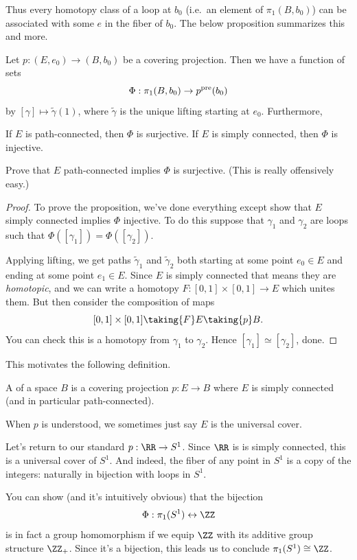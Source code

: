 Thus every homotopy class of a loop at $b_0$ (i.e.\ an element of $\pi_1(B, b_0)$) can be associated with some $e$ in the fiber of $b_0$.
The below proposition summarizes this and more.
\begin{proposition}
	Let $p : (E,e_0) \to (B,b_0)$ be a covering projection.
	Then we have a function of sets
	\[ \Phi : \pi_1(B, b_0) \to p^{\text{pre}}(b_0) \]
	by $[\gamma] \mapsto \tilde\gamma(1)$, where $\tilde\gamma$
	is the unique lifting starting at $e_0$.
	Furthermore,
	\begin{itemize}
		\ii If $E$ is path-connected, then $\Phi$ is surjective.
		\ii If $E$ is simply connected, then $\Phi$ is injective.
	\end{itemize}
\end{proposition}
\begin{ques}
	Prove that $E$ path-connected implies $\Phi$ is surjective.
	(This is really offensively easy.)
\end{ques}
\begin{proof}
	To prove the proposition, we've done everything except show
	that $E$ simply connected implies $\Phi$ injective.
	To do this suppose that $\gamma_1$ and $\gamma_2$ are loops
	such that $\Phi([\gamma_1]) = \Phi([\gamma_2])$.

	Applying lifting, we get paths $\tilde\gamma_1$ and $\tilde\gamma_2$
	both starting at some point $e_0 \in E$ and ending at some point $e_1 \in E$.
	Since $E$ is simply connected that means they are \emph{homotopic},
	and we can write a homotopy $F : [0,1] \times [0,1] \to E$
	which unites them.
	But then consider the composition of maps
	\[ [0,1] \times [0,1] \taking{F} E \taking{p} B. \]
	You can check this is a homotopy from $\gamma_1$ to $\gamma_2$.
	Hence $[\gamma_1] \simeq [\gamma_2]$, done.
\end{proof}

This motivates the following definition.
\begin{definition}
	A  of a space $B$ is a covering projection
	$p : E \to B$ where $E$ is simply connected (and in particular path-connected).
\end{definition}
\begin{abuse}
	When $p$ is understood, we sometimes just say $E$ is the universal cover.
\end{abuse}

\begin{example}
	Let's return to our standard $p : \RR \to S^1$.
	Since $\RR$ is is simply connected, this is a universal cover of $S^1$.
	And indeed, the fiber of any point in $S^1$
	is a copy of the integers: naturally in bijection with loops in $S^1$.
	
	You can show (and it's intuitively obvious) that the bijection
	\[ \Phi : \pi_1(S^1) \leftrightarrow \ZZ \]
	is in fact a group homomorphism if we equip $\ZZ$ with its
	additive group structure $\ZZ_+$.
	Since it's a bijection, this leads us to conclude $\pi_1(S^1) \cong \ZZ$.
\end{example}

